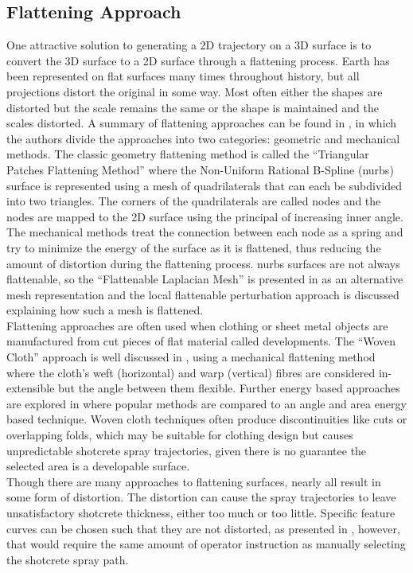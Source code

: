 \subsection{Flattening Approach}
One attractive solution to generating a 2D trajectory on a 3D surface is to convert the 3D surface to a 2D surface through a flattening process. Earth has been represented on flat surfaces many times throughout history, but all projections distort the original in some way. Most often either the shapes are distorted but the scale remains the same or the shape is maintained and the scales distorted. A summary of flattening approaches can be found in \cite{overflat}, in which the authors divide the approaches into two categories: geometric and mechanical methods. The classic geometry flattening method is called the ``Triangular Patches Flattening Method'' where the Non-Uniform Rational B-Spline (\acrshort{nurbs}) surface is represented using a mesh of quadrilaterals that can each be subdivided into two triangles. The corners of the quadrilaterals are called nodes and the nodes are mapped to the 2D surface using the principal of increasing inner angle. The mechanical methods treat the connection between each node as a spring and try to minimize the energy of the surface as it is flattened, thus reducing the amount of distortion during the flattening process. \acrshort{nurbs} surfaces are not always flattenable, so the ``Flattenable Laplacian Mesh'' is presented in \cite{toward} as an alternative mesh representation and the local flattenable perturbation approach is discussed explaining how such a mesh is flattened.\\

Flattening approaches are often used when clothing or sheet metal objects are manufactured from cut pieces of flat material called developments. The ``Woven Cloth'' approach is well discussed in \cite{woven,freef}, using a mechanical flattening method where the cloth's weft (horizontal) and warp (vertical) fibres are considered in-extensible but the angle between them flexible. Further energy based approaches are explored in \cite{parameet} where popular methods are compared to an angle and area energy based technique. Woven cloth techniques often produce discontinuities like cuts or overlapping folds, which may be suitable for clothing design but causes unpredictable shotcrete spray trajectories, given there is no guarantee the selected area is a developable surface.\\

Though there are many approaches to flattening surfaces, nearly all result in some form of distortion. The distortion can cause the spray trajectories to leave unsatisfactory shotcrete thickness, either too much or too little. Specific feature curves can be chosen such that they are not distorted, as presented in \cite{wwarp,wwarpp}, however, that would require the same amount of operator instruction as manually selecting the shotcrete spray path.\\

